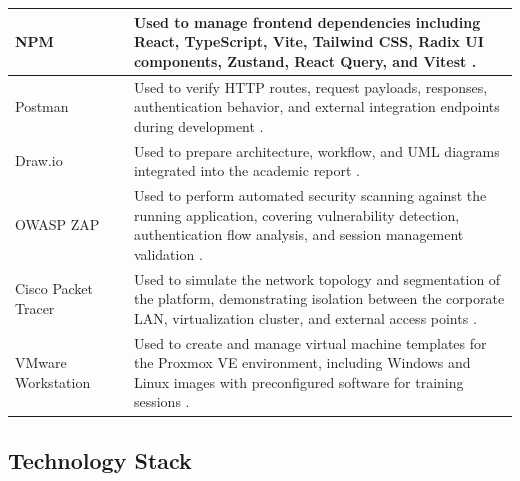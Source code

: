 \begin{longtable}{|C{3.7cm}|C{2.2cm}|C{8.7cm}|}
  NPM                 &             & Used to manage frontend
  dependencies including React, TypeScript, Vite, Tailwind CSS, Radix UI
  components, Zustand, React Query, and Vitest {\footnotesize\cite{npm-docs}}.                                 \\
  \hline

  Postman             &         & Used to verify HTTP
  routes, request payloads, responses, authentication behavior, and external
  integration endpoints during development {\footnotesize\cite{postman-docs}}.                                 \\
  \hline

  Draw.io             &          & Used to prepare
  architecture, workflow, and UML diagrams integrated into the academic report
                                                                          {\footnotesize\cite{drawio-site}}.   \\ \hline

  OWASP ZAP           &             & Used to perform
  automated security scanning against the running application, covering
  vulnerability detection, authentication flow analysis, and session management
  validation {\footnotesize\cite{owasp-zap-docs}}.                                                             \\ \hline

  Cisco Packet Tracer &   & Used
  to simulate the network topology and segmentation of the platform,
  demonstrating isolation between the corporate LAN, virtualization cluster, and
  external access points {\footnotesize\cite{cisco-packet-tracer-docs}}.                                       \\
  \hline

  VMware Workstation  &          & Used to
  create and manage virtual machine templates for the Proxmox VE environment,
  including Windows and Linux images with preconfigured software for training
  sessions {\footnotesize\cite{vmware-docs}}.                                                                  \\ \hline
\end{longtable}
\normalsize
\subsection{Technology Stack}

